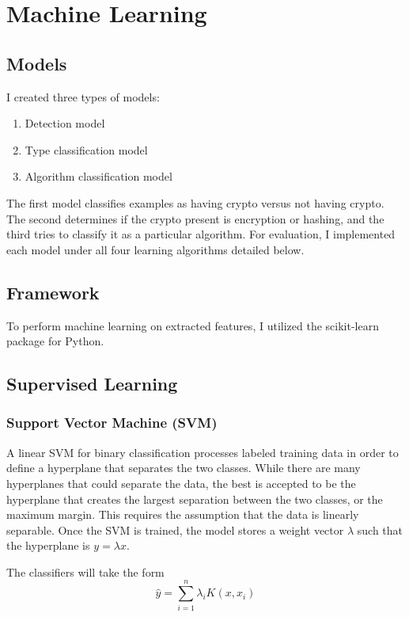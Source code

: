 \chapter{Machine Learning}

\section{Models}

I created three types of models:
\begin{enumerate}
	\item Detection model
	\item Type classification model
	\item Algorithm classification model
\end{enumerate}

The first model classifies examples as having crypto versus not having crypto.  The second determines if the crypto present is encryption or hashing, and the third tries to classify it as a particular algorithm.  For evaluation, I implemented each model under all four learning algorithms detailed below.

\section{Framework}

To perform machine learning on extracted features, I utilized the scikit-learn \cite{scikit-learn} package for Python.

\section{Supervised Learning}
\subsection{Support Vector Machine (SVM)}
A linear SVM for binary classification processes labeled training data in order to define a hyperplane that separates the two classes.  While there are many hyperplanes that could separate the data, the best is accepted to be the hyperplane that creates the largest separation between the two classes, or the maximum margin.  This requires the assumption that the data is linearly separable.  Once the SVM is trained, the model stores a weight vector $\lambda$ such that the hyperplane is $y = \lambda x$.  

The classifiers will take the form
\begin{equation}
	\hat{y} = \sum_{i=1}^n \lambda_i K(x, x_i) \label{svm}
\end{equation}

